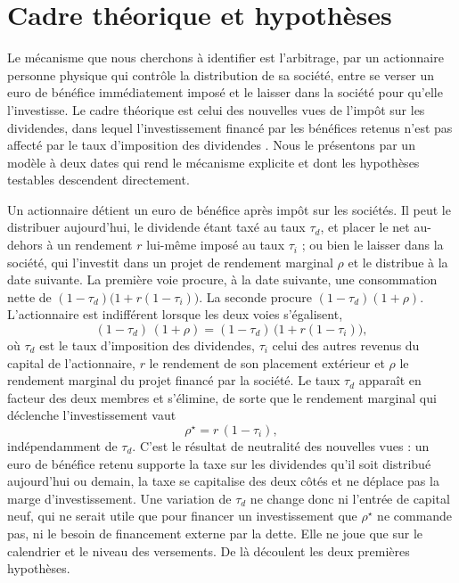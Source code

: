 \section{Cadre théorique et hypothèses}\label{sec:cadre}

Le mécanisme que nous cherchons à identifier est l'arbitrage, par un actionnaire personne physique
qui contrôle la distribution de sa société, entre se verser un euro de bénéfice immédiatement
imposé et le laisser dans la société pour qu'elle l'investisse. Le cadre théorique est celui des
nouvelles vues de l'impôt sur les dividendes, dans lequel l'investissement financé par les bénéfices
retenus n'est pas affecté par le taux d'imposition des dividendes \citep{auerbach1979,king1977,chetty2005}.
Nous le présentons par un modèle à deux dates qui rend le mécanisme explicite et dont les hypothèses
testables descendent directement.

Un actionnaire détient un euro de bénéfice après impôt sur les sociétés. Il peut le distribuer
aujourd'hui, le dividende étant taxé au taux $\tau_d$, et placer le net au-dehors à un rendement $r$
lui-même imposé au taux $\tau_i$ ; ou bien le laisser dans la société, qui l'investit dans un projet
de rendement marginal $\rho$ et le distribue à la date suivante. La première voie procure, à la date
suivante, une consommation nette de $(1-\tau_d)\bigl(1 + r(1-\tau_i)\bigr)$. La seconde procure
$(1-\tau_d)(1+\rho)$. L'actionnaire est indifférent lorsque les deux voies s'égalisent,
\begin{equation}\label{eq:arbitrage}
  (1-\tau_d)\,(1+\rho) = (1-\tau_d)\,\bigl(1 + r(1-\tau_i)\bigr),
\end{equation}
où $\tau_d$ est le taux d'imposition des dividendes, $\tau_i$ celui des autres revenus du capital de
l'actionnaire, $r$ le rendement de son placement extérieur et $\rho$ le rendement marginal du projet
financé par la société. Le taux $\tau_d$ apparaît en facteur des deux membres et s'élimine, de sorte
que le rendement marginal qui déclenche l'investissement vaut
\begin{equation}\label{eq:neutralite}
  \rho^{\star} = r\,(1-\tau_i),
\end{equation}
indépendamment de $\tau_d$. C'est le résultat de neutralité des nouvelles vues : un euro de bénéfice
retenu supporte la taxe sur les dividendes qu'il soit distribué aujourd'hui ou demain, la taxe se
capitalise des deux côtés et ne déplace pas la marge d'investissement. Une variation de $\tau_d$ ne
change donc ni l'entrée de capital neuf, qui ne serait utile que pour financer un investissement
que $\rho^{\star}$ ne commande pas, ni le besoin de financement externe par la dette. Elle ne joue
que sur le calendrier et le niveau des versements. De là découlent les deux premières hypothèses.

